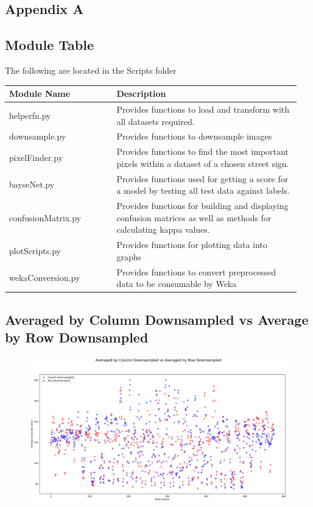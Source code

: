 \documentclass[11pt]{article}
\begin{document}
\pagebreak
\appendix
\appendixpage
\addappheadtotoc
\begin{appendices}
\section{Appendix A}
\subsection{Module Table}\label{tab:moduleTable}
The following are located in the Scripts folder
\begin{table}[ht]
    \centering
    \begin{tabular}{|p{0.35\linewidth} | p{0.6\linewidth}|} 
      \hline
      \textbf{Module Name}  & \textbf{Description} \\ \hline
      helperfn.py & Provides functions to load and transform with all datasets required. \\ \hline
      downsample.py & Provides functions to downsample images  \\ \hline
      pixelFinder.py & Provides functions to find the most important pixels within a dataset of a chosen street sign. \\ \hline
      bayseNet.py & Provides functions used for getting a score for a model by testing all test data against labels. \\ \hline
      confusionMatrix.py & Provides functions for building and displaying confusion matrices as well as methods for calculating kappa values. \\ \hline
      plotScripts.py & Provides functions for plotting data into graphs \\ \hline
      wekaConversion.py & Provides functions to convert preprocessed data to be consumable by Weka\\
      \hline
    \end{tabular}
\end{table}

\newpage
\subsection{Averaged by Column Downsampled vs Average by Row Downsampled}\label{AvColDSvAvRowDS}
\begin{figure}[h!]
  \centering
  \includegraphics[scale=0.3]{Images/AvColDS vs AvRowDS.png}
\end{figure}


\end{appendices}
\end{document}
